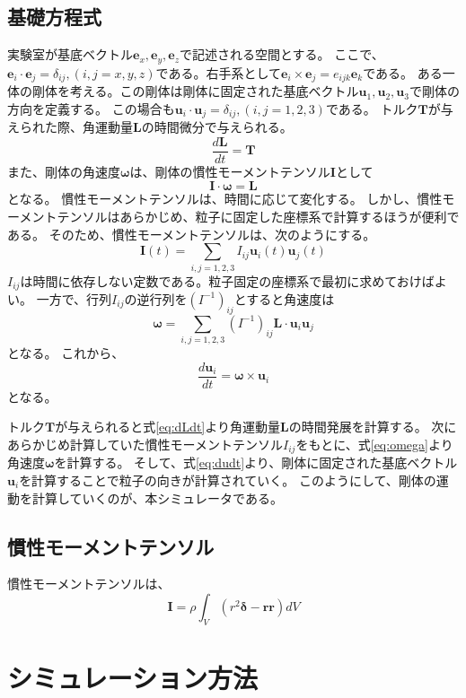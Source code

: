 \documentclass[a4paper,11pt]{jbook}
\begin{document}
\section{基礎方程式}
実験室が基底ベクトル$\bm{e}_x, \bm{e}_y,\bm{e}_z $で記述される空間とする。
ここで、$\bm{e}_i\cdot\bm{e}_j=\delta_{ij}, (i,j=x,y,z)$である。右手系として$\bm{e}_i\times\bm{e}_j=e_{ijk}\bm{e}_k$である。
ある一体の剛体を考える。この剛体は剛体に固定された基底ベクトル$\bm{u}_1,\bm{u}_2,\bm{u}_3$で剛体の方向を定義する。
この場合も$\bm{u}_i\cdot\bm{u}_j=\delta_{ij}, (i,j=1,2,3)$である。
トルク$\bm{T}$が与えられた際、角運動量$\bm{L}$の時間微分で与えられる。
\begin{equation}
\frac{d\bm{L}}{dt}=\bm{T}
\label{eq:dLdt}
\end{equation}
また、剛体の角速度$\bm{\omega}$は、剛体の慣性モーメントテンソル$\bm{I}$として
\begin{equation}
\bm{I}\cdot\bm{\omega}=\bm{L}
\end{equation}
となる。
慣性モーメントテンソルは、時間に応じて変化する。
しかし、慣性モーメントテンソルはあらかじめ、粒子に固定した座標系で計算するほうが便利である。
そのため、慣性モーメントテンソルは、次のようにする。
\begin{equation}
\bm{I}(t)=\sum_{i,j=1,2,3}I_{ij}\bm{u}_i(t)\bm{u}_j(t)
\end{equation}
$I_{ij}$は時間に依存しない定数である。粒子固定の座標系で最初に求めておけばよい。
一方で、行列$I_{ij}$の逆行列を$(I^{-1})_{ij}$とすると角速度は
 \begin{equation}
 \bm{\omega}=\sum_{i,j=1,2,3}(I^{-1})_{ij}\bm{L}\cdot\bm{u}_i\bm{u}_j
 \label{eq:omega}
 \end{equation}
 となる。
 これから、
\begin{equation}
\frac{d\bm{u}_i}{dt}=\bm{\omega}\times\bm{u}_i
\label{eq:dudt}
\end{equation}
となる。

トルク$\bm{T}$が与えられると式\eqref{eq:dLdt}より角運動量$\bm{L}$の時間発展を計算する。
次にあらかじめ計算していた慣性モーメントテンソル$I_{ij}$をもとに、式\eqref{eq:omega}より角速度$\bm{\omega}$を計算する。
そして、式\eqref{eq:dudt}より、剛体に固定された基底ベクトル$\bm{u}_i$を計算することで粒子の向きが計算されていく。
このようにして、剛体の運動を計算していくのが、本シミュレータである。
\section{慣性モーメントテンソル}
慣性モーメントテンソルは、
\begin{equation}
\bm{I}=\rho\int_V\left(r^2\bm{\delta}-\bm{r}\bm{r}\right)dV
\end{equation}
\chapter{シミュレーション方法}
\chapter{}
 
  
\end{document}
